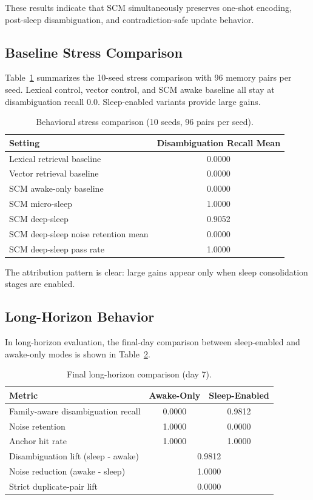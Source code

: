 \documentclass[11pt,a4paper]{article}
\begin{document}
These results indicate that SCM simultaneously preserves one-shot encoding, post-sleep disambiguation, and contradiction-safe update behavior.

\subsection{Baseline Stress Comparison}
Table~\ref{tab:baseline} summarizes the 10-seed stress comparison with 96 memory pairs per seed. Lexical control, vector control, and SCM awake baseline all stay at disambiguation recall 0.0. Sleep-enabled variants provide large gains.

\begin{table}[htbp]
\centering
\caption{Behavioral stress comparison (10 seeds, 96 pairs per seed).}
\label{tab:baseline}
\begin{tabular}{@{}lc@{}}
\toprule
\textbf{Setting} & \textbf{Disambiguation Recall Mean} \\
\midrule
Lexical retrieval baseline & 0.0000 \\
Vector retrieval baseline & 0.0000 \\
SCM awake-only baseline & 0.0000 \\
SCM micro-sleep & 1.0000 \\
SCM deep-sleep & 0.9052 \\
\midrule
SCM deep-sleep noise retention mean & 0.0000 \\
SCM deep-sleep pass rate & 1.0000 \\
\bottomrule
\end{tabular}
\end{table}

The attribution pattern is clear: large gains appear only when sleep consolidation stages are enabled.

\subsection{Long-Horizon Behavior}
In long-horizon evaluation, the final-day comparison between sleep-enabled and awake-only modes is shown in Table~\ref{tab:long_horizon}.

\begin{table}[htbp]
\centering
\caption{Final long-horizon comparison (day 7).}
\label{tab:long_horizon}
\begin{tabular}{@{}lcc@{}}
\toprule
\textbf{Metric} & \textbf{Awake-Only} & \textbf{Sleep-Enabled} \\
\midrule
Family-aware disambiguation recall & 0.0000 & 0.9812 \\
Noise retention & 1.0000 & 0.0000 \\
Anchor hit rate & 1.0000 & 1.0000 \\
\midrule
Disambiguation lift (sleep - awake) & \multicolumn{2}{c}{0.9812} \\
Noise reduction (awake - sleep) & \multicolumn{2}{c}{1.0000} \\
Strict duplicate-pair lift & \multicolumn{2}{c}{0.0000} \\
\bottomrule
\end{tabular}
\end{table}
\end{document}
